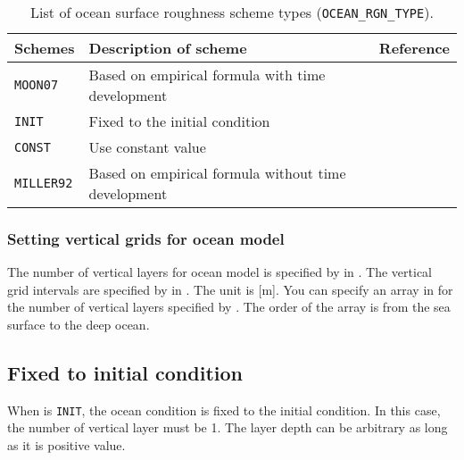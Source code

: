 \begin{table}[h]
\begin{center}
  \caption{List of ocean surface roughness scheme types (\texttt{OCEAN\_RGN\_TYPE}).}
  \label{tab:nml_ocean_rgn}
  \begin{tabularx}{150mm}{llX} \hline
    \rowcolor[gray]{0.9}  Schemes & Description of scheme & Reference \\ \hline
      \verb|MOON07|   & Based on empirical formula with time development    & \citet{moon_2007} \\
      \verb|INIT|     & Fixed to the initial condition \\
      \verb|CONST|    & Use constant value \\
      \verb|MILLER92| & Based on empirical formula without time development & \citet{miller_1992} \\
    \hline
  \end{tabularx}
\end{center}
\end{table}

\subsubsection{Setting vertical grids for ocean model}

The number of vertical layers for ocean model is specified by  in .
The vertical grid intervals are specified by  in . The unit is [m].
You can specify an array in  for the number of vertical layers specified by .
The order of the array is from the sea surface to the deep ocean.


\subsection{Fixed to initial condition}
When  is \verb|INIT|, the ocean condition is fixed to the initial condition.
In this case, the number of vertical layer must be 1.
The layer depth can be arbitrary as long as it is positive value.



